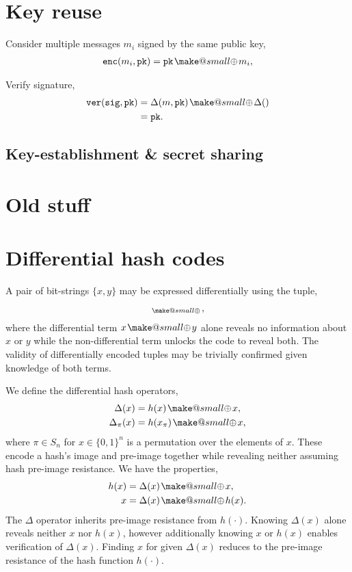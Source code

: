 \documentclass[twocolumn, aps, amsmath, amssymb, nofootinbib, superscriptaddress, longbibliography, doublefloatfix, table-of-contents, eqsecnum, rmp]{revtex4-2}
\makeatletter
\def\pk{\mathtt{pk}}
\def\sig{\mathtt{sig}}
\def\ver{\mathtt{ver}}
\def\enc{\mathtt{enc}}
\newcommand{\soplus}{{{\hspace{1pt}}{\mathbin{\mathpalette\make@small{\mathbin\oplus}}}}{\hspace{1pt}}}
\newcommand{\make@small}[2]{%
  \vcenter{\hbox{%
    \scalebox{0.6}{$\m@th#1#2$}%
  }}%
}
\makeatother
\begin{document}
\section{Key reuse}

Consider multiple messages $m_i$ signed by the same public key,
\begin{align}
	\enc(m_i,\pk) &= \pk \soplus m_i, \nonumber\\
\end{align}

Verify signature,
\begin{align}
	\ver(\sig,\pk) &= \Delta(m,\pk) \soplus \Delta() \nonumber\\
	&= \pk.
\end{align}

\subsection{Key-establishment \& secret sharing}

\section{Old stuff}

\section{Differential hash codes}

A pair of bit-strings $\{x,y\}$ may be expressed differentially using the tuple,
\begin{align}
	[x,x\soplus y]_\soplus,
\end{align}
where the differential term $x\soplus y$ alone reveals no information about $x$ or $y$ while the non-differential term unlocks the code to reveal both. The validity of differentially encoded tuples may be trivially confirmed given knowledge of both terms.

We define the differential hash operators,
\begin{align}
	\Delta(x) &= h(x)\soplus x,\nonumber\\
	\Delta_\pi(x) &= h(x_\pi)\soplus x,
\end{align}
where $\pi\in S_n$ for $x\in\{0,1\}^n$ is a permutation over the elements of $x$. These encode a hash's image and pre-image together while revealing neither assuming hash pre-image resistance. We have the properties,
\begin{align}
	h(x) &= \Delta(x) \soplus x,\nonumber\\
	x &= \Delta(x) \soplus h(x).
\end{align}
The $\Delta$ operator inherits pre-image resistance from $h(\cdot)$. Knowing $\Delta(x)$ alone reveals neither $x$ nor $h(x)$, however additionally knowing $x$ or $h(x)$ enables verification of $\Delta(x)$. Finding $x$ for given $\Delta(x)$ reduces to the pre-image resistance of the hash function $h(\cdot)$.
\end{document}
